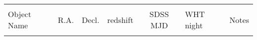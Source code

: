 \begin{table*}
\begin{tabular} {l  cc  cc l l}
\hline \hline
                                                 &                              &                             &                                   &                                        &                   & \\
Object Name                             & R.A.                       & Decl.                     & redshift                     & SDSS MJD                        & WHT night &  Notes\\
                                                 &                              &                             &                                   &                                        &                   & \\
\hline      


\end{tabular}
\end{table*}
